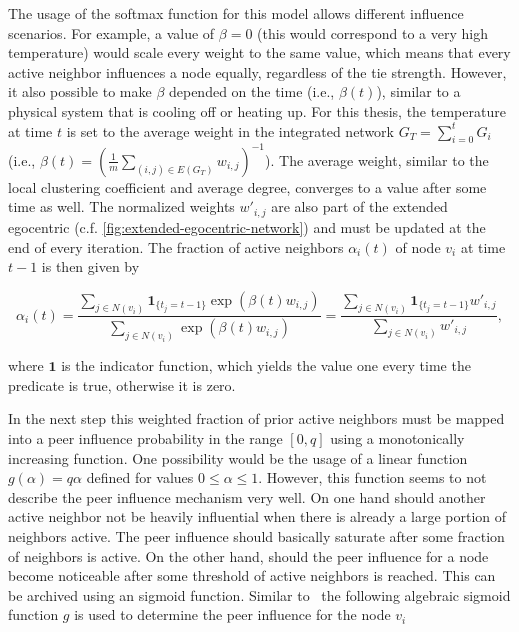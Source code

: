 The usage of the softmax function for this model allows different influence scenarios.
For example, a value of \( \beta = 0 \) (this would correspond to a very high temperature) would scale every weight to the same value, which means that every active neighbor influences a node equally, regardless of the tie strength.
However, it also possible to make \( \beta \) depended on the time (i.e., \( \beta(t) \)), similar to a physical system that is cooling off or heating up.
For this thesis, the temperature at time \( t \) is set to the average weight in the integrated network \( G_{T} = \sum_{i=0}^{t} G_{i}\) (i.e., \( \beta(t) = (\frac{1}{m} \sum_{(i,j) \in E(G_{T})} w_{i,j})^{-1} \)).
The average weight, similar to the local clustering coefficient and average degree, converges to a value after some time as well.
The normalized weights \( w'_{i,j} \) are also part of the extended egocentric (c.f. \autoref{fig:extended-egocentric-network}) and must be updated at the end of every iteration.
The fraction of active neighbors \( \alpha_{i}(t) \) of node \(v_{i} \) at time \( t - 1 \) is then given by

\begin{equation}
    \alpha_{i}(t) = \frac{\sum_{j \in N(v_{i})} \mathbf{1}_{\{t_{j} = t-1\}} \exp(\beta(t) w_{i, j})}{\sum_{j \in N(v_{i})} \exp(\beta(t) w_{i, j})} = \frac{\sum_{j \in N(v_{i})} \mathbf{1}_{\{t_{j} = t-1\}} w'_{i, j}}{\sum_{j \in N(v_{i})} w'_{i, j}},
\end{equation}

where \( \mathbf{1} \) is the indicator function, which yields the value one every time the predicate is true, otherwise it is zero.

In the next step this weighted fraction of prior active neighbors must be mapped into a peer influence probability in the range \( [0, q] \) using a monotonically increasing function.
One possibility would be the usage of a linear function \( g(\alpha) = q \alpha \) defined for values \(0 \leq \alpha \leq 1 \).
However, this function seems to not describe the peer influence mechanism very well.
On one hand should another active neighbor not be heavily influential when there is already a large portion of neighbors active.
The peer influence should basically saturate after some fraction of neighbors is active.
On the other hand, should the peer influence for a node become noticeable after some threshold of active neighbors is reached.
This can be archived using an sigmoid function.
Similar to~\cite{Walk2016} the following algebraic sigmoid  function \( g \) is used to determine the peer influence for the node \( v_{i} \)

